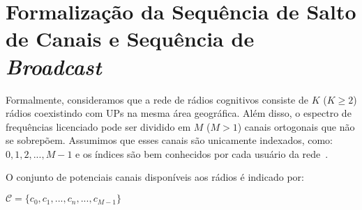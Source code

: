 


\section{Formalização da Sequência de Salto de Canais e Sequência de \textit{Broadcast}}


Formalmente, consideramos que a rede de rádios cognitivos consiste de $K$ ($K \geq 2$) rádios coexistindo com UPs na mesma área geográfica. Além disso, o espectro de frequências licenciado pode ser dividido em $M$ ($M > 1$) canais ortogonais que não se sobrepõem. Assumimos que esses canais são unicamente indexados, como: $0,1,2,...,M-1$ e os índices são bem conhecidos por cada usuário da rede~\cite{quorum}.



O conjunto de potenciais canais disponíveis aos rádios é indicado por: 

\vspace{0.3cm}

$\mathcal{C} = \{ c_{0},c_{1},...,c_{n},...,c_{M-1} \}$

\vspace{0.3cm}

